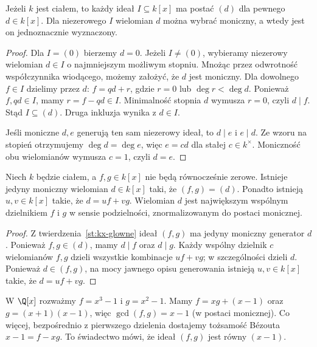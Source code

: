 \begin{stwierdzenie}
\label{st:kx-glowne}
Jeżeli $k$ jest ciałem, to każdy ideał $I\subseteq k[x]$
ma postać $(d)$ dla pewnego $d\in k[x]$.
Dla niezerowego $I$ wielomian $d$ można wybrać moniczny,
a wtedy jest on jednoznacznie wyznaczony.
\end{stwierdzenie}
\begin{proof}
Dla $I=(0)$ bierzemy $d=0$.
Jeżeli $I\ne(0)$, wybieramy niezerowy wielomian $d\in I$
o najmniejszym możliwym stopniu. Mnożąc przez odwrotność
współczynnika wiodącego, możemy założyć, że $d$ jest moniczny.
Dla dowolnego $f\in I$ dzielimy przez $d$:
$f=qd+r$, gdzie $r=0$ lub $\deg r<\deg d$.
Ponieważ $f,qd\in I$, mamy $r=f-qd\in I$.
Minimalność stopnia $d$ wymusza $r=0$, czyli $d\mid f$.
Stąd $I\subseteq(d)$. Druga inkluzja wynika z $d\in I$.

Jeśli moniczne $d,e$ generują ten sam niezerowy ideał,
to $d\mid e$ i $e\mid d$. Ze wzoru na stopień otrzymujemy
$\deg d=\deg e$, więc $e=cd$ dla stałej $c\in k^\times$.
Moniczność obu wielomianów wymusza $c=1$, czyli $d=e$.
\end{proof}

\begin{twierdzenie}
\label{tw:bezout-pol}
Niech $k$ będzie ciałem, a $f,g\in k[x]$ nie będą równocześnie zerowe.
Istnieje jedyny moniczny wielomian $d\in k[x]$ taki, że
$(f,g)=(d)$. Ponadto istnieją $u,v\in k[x]$ takie, że
$d=uf+vg$. Wielomian $d$ jest największym wspólnym dzielnikiem
$f$ i $g$ w sensie podzielności, znormalizowanym do postaci monicznej.
\end{twierdzenie}
\begin{proof}
Z twierdzenia~\ref{st:kx-glowne} ideał $(f,g)$ ma jedyny moniczny
generator $d$. Ponieważ $f,g\in(d)$, mamy $d\mid f$ oraz $d\mid g$.
Każdy wspólny dzielnik $c$ wielomianów $f,g$ dzieli wszystkie
kombinacje $uf+vg$; w szczególności dzieli $d$.
Ponieważ $d\in(f,g)$, na mocy jawnego opisu generowania
istnieją $u,v\in k[x]$ takie, że $d=uf+vg$.
\end{proof}

\begin{przyklad}
W $\Q[x]$ rozważmy $f=x^3-1$ i $g=x^2-1$.
Mamy $f=xg+(x-1)$ oraz $g=(x+1)(x-1)$,
więc $\gcd(f,g)=x-1$ (w postaci monicznej).
Co więcej, bezpośrednio z pierwszego dzielenia dostajemy
tożsamość Bézouta $x-1=f-xg$.
To świadectwo mówi, że ideał $(f,g)$ jest równy $(x-1)$.
\end{przyklad}

